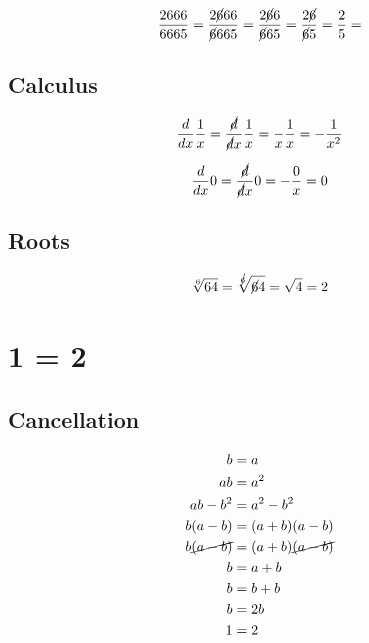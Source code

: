 \documentclass{article}
\begin{document}
\begin{equation}
	\begin{split}
		\frac{2666}{6665}
		=
		\frac{2\cancel{6}66}{\cancel{6}665}
		=
		\frac{2\cancel{6}6}{\cancel{6}65}
		=
		\frac{2\cancel{6}}{\cancel{6}5}
		=
	    \frac{2}{5} =
	\end{split}
\end{equation}



\subsection{Calculus}
\begin{equation}
	\begin{split}
		\frac{d}{dx}
		\frac{1}{x}
		=
		\frac{\cancel{d}}{\cancel{d}x}
		\frac{1}{x}
		=
		\frac{}{x}
		\frac{1}{x}
		=
		- \frac{1}{x^2}
	\end{split}
\end{equation}

\begin{equation}
	\begin{split}
		\frac{d}{dx} 0 =
		\frac{\cancel{d}}{\cancel{d}x} 0
		=
		-\frac{0}{x}
		=
		0
	\end{split}
\end{equation}


\subsection{Roots}

\begin{equation}
	\begin{split}
	     \sqrt[6]{64} = \sqrt[\cancel{6}]{\cancel{6}4} = \sqrt{4} = 2
	\end{split}
\end{equation}

\section{1 = 2}

\subsection{Cancellation}

\begin{equation}
	\begin{split}
		b        &= a \\
		ab       &= a^2 \\
		ab - b^2 &= a^2 - b^2 \\
		b(a - b) &= (a + b)(a - b) \\
		b\cancel{(a - b)} &= (a + b)\cancel{(a - b)} \\
		b        &= a + b \\
		b        &= b + b \\
		b        &= 2b \\
		1        &= 2
	\end{split}
\end{equation}
\end{document}
